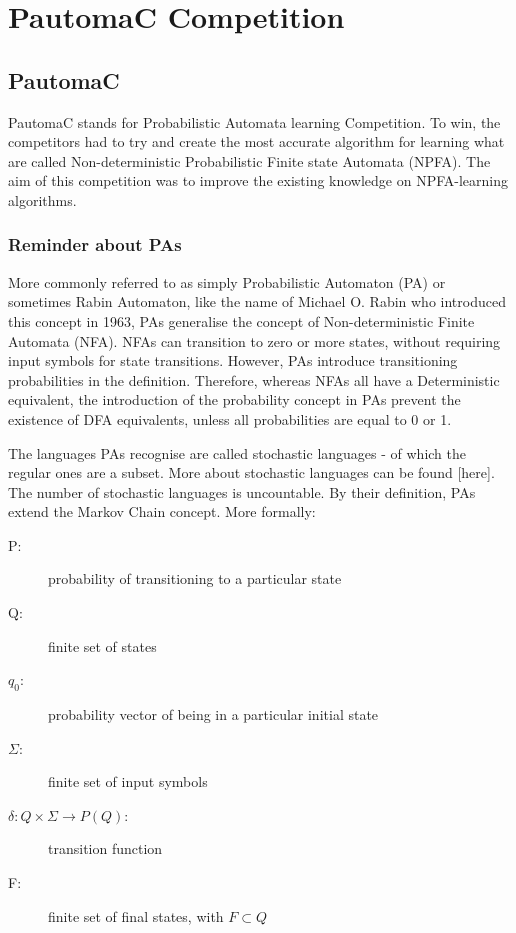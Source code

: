 \section{PautomaC Competition}

\subsection{PautomaC}

PautomaC stands for Probabilistic Automata learning Competition. To
win, the competitors had to try and create the most accurate algorithm
for learning what are called Non-deterministic Probabilistic Finite
state Automata (NPFA). The aim of this competition was to improve
the existing knowledge on NPFA-learning algorithms.


\subsubsection{Reminder about PAs}

More commonly referred to as simply Probabilistic Automaton (PA) or
sometimes Rabin Automaton, like the name of Michael O. Rabin who introduced
this concept in 1963, PAs generalise the concept of Non-deterministic
Finite Automata (NFA). NFAs can transition to zero or more states,
without requiring input symbols for state transitions. However, PAs
introduce transitioning probabilities in the definition. Therefore,
whereas NFAs all have a Deterministic equivalent, the introduction
of the probability concept in PAs prevent the existence of DFA equivalents,
unless all probabilities are equal to 0 or 1.

The languages PAs recognise are called stochastic languages - of which
the regular ones are a subset. More about stochastic languages can
be found {[}here{]}. The number of stochastic languages is uncountable.
By their definition, PAs extend the Markov Chain concept. More formally:

\begin{description}
	\item [{P:}] probability of transitioning to a particular state
	\item [{Q:}] finite set of states
	\item [{$q_{0}$:}] probability vector of being in a particular initial
	state
	\item [{$\varSigma$:}] finite set of input symbols
	\item [{$\delta:Q\times\varSigma\longrightarrow P(Q)$:}] transition function
	\item [{F:}] finite set of final states, with $F\subset Q$
\end{description}

